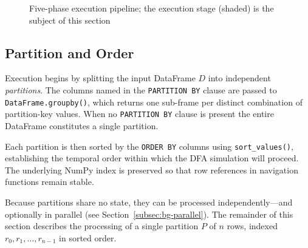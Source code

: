 \begin{figure}[htbp]
  \centering
  \caption{Five-phase execution pipeline; the execution stage (shaded)
    is the subject of this section}
  \label{fig:exec-pipeline}
\end{figure}

\subsection{Partition and Order}
\label{subsec:meth-exec-partition}

Execution begins by splitting the input DataFrame $D$ into
independent \emph{partitions}.  The columns named in the
\texttt{PARTITION BY} clause are passed to
\texttt{DataFrame.groupby()}, which returns one sub-frame per
distinct combination of partition-key values.  When no
\texttt{PARTITION BY} clause is present the entire DataFrame
constitutes a single partition.

Each partition is then sorted by the \texttt{ORDER BY} columns
using \texttt{sort\_values()}, establishing the temporal order
within which the DFA simulation will proceed.  The underlying
NumPy index is preserved so that row references in navigation
functions remain stable.

Because partitions share no state, they can be processed
independently—and optionally in parallel (see
Section~\ref{subsec:bg-parallel}).  The remainder of this section
describes the processing of a single partition $P$ of $n$ rows,
indexed $r_0, r_1, \ldots, r_{n-1}$ in sorted order.

